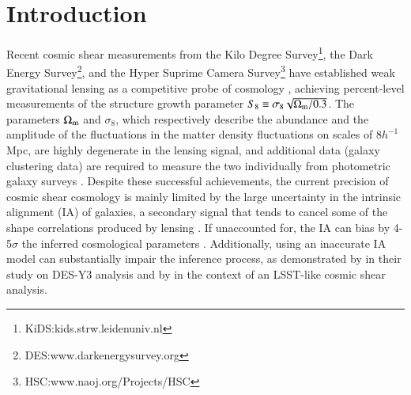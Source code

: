 \section{Introduction}
\label{sec:intro}

Recent cosmic shear measurements from the Kilo Degree Survey\footnote{KiDS:kids.strw.leidenuniv.nl}, the Dark Energy Survey\footnote{DES:www.darkenergysurvey.org}, and the Hyper Suprime Camera Survey\footnote{HSC:www.naoj.org/Projects/HSC} have established weak gravitational lensing as a competitive probe of cosmology \citep[see. \eg][]{KiDS1000_Asgari, KiDS1000_vdB, KiDS1000_Li, DESY3_Secco, DESY3_Amon, HSCY3_Cl, HSCY3_2pcf}, achieving  percent-level measurements of the structure growth parameter $S_8\equiv\sigma_8\sqrt{\Omega_{\rm m}/0.3}$.
The parameters $\Omega_{\rm m}$ and $\sigma_8$, which respectively describe the abundance and the amplitude of the fluctuations in the matter density fluctuations on scales of $8h^{-1}$ Mpc, are highly degenerate in the lensing signal, and additional data (\eg galaxy clustering data) are required to measure the two individually from photometric galaxy surveys \citep{KiDS1000_Heymans, DESY3_3x2, HSCY3_3x2}.
Despite these successful achievements, the current precision of cosmic shear cosmology is mainly limited by the large uncertainty in the intrinsic alignment (IA) of galaxies, a secondary signal that tends to cancel some of the shape correlations produced by lensing \citep[see. \eg][for reviews on IA]{Troxel_IA_review_2015, Kirk_IA_review_2015, Joachimi_IA_review_2015, Kiessling_IA_review_2015,Lamman_IA_guide}. 
If unaccounted for, the IA can bias by 4-5$\sigma$ the inferred cosmological parameters \citep{Kirk2012, Krause2016}.
Additionally, using an inaccurate IA model can substantially impair the inference process, as demonstrated by \citet{DESY3_Secco} in their study on DES-Y3 analysis and by \citet{Paopiamsap2024} in the context of an LSST-like cosmic shear analysis.

